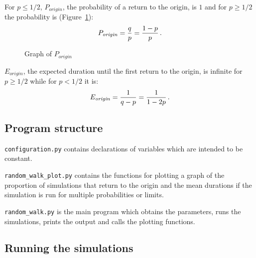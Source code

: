 For $p\leq 1/2$, $P_{\mathit{origin}}$, the probability of a return to the origin, is $1$ and for $p\geq 1/2$ the probability is (Figure~\ref{f.walk1}):
\[
P_{\mathit{origin}} = \displaystyle\frac{q}{p}=\displaystyle\frac{1-p}{p}\,.
\]
\begin{figure}
\begin{center}
\caption{Graph of $P_{\mathit{origin}}$}\label{f.walk1}
\end{center}
\end{figure}

$E_{\mathit{origin}}$, the expected duration until the first return to the origin, is infinite for $p\geq 1/2$ while for $p<1/2$ it is:
\[
E_{\mathit{origin}}=\displaystyle\frac{1}{q-p}=\displaystyle\frac{1}{1-2p}\,.
\]

\subsection{Program structure}

\verb+configuration.py+ contains declarations of variables which are intended to be constant.

\verb+random_walk_plot.py+ contains the functions for plotting a graph of the proportion of simulations that return to the origin and the mean durations if the simulation is run for multiple probabilities or limits.

\verb+random_walk.py+ is the main program which obtains the parameters, runs the simulations, prints the output and calls the plotting functions.

\subsection{Running the simulations}

